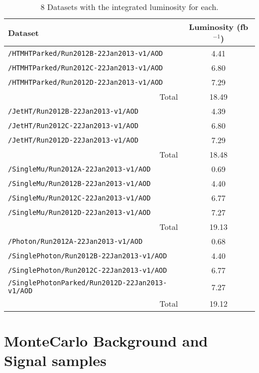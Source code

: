 \begin{table}[ht]
\caption{8 \tev Datasets with the integrated luminosity for each.}
  \label{tab:datasets}
  \centering
  \scriptsize
  \begin{tabular}{ lc }
    \hline
    \hline
    Dataset & Luminosity (fb$^{-1}$) \\
    \hline
    \verb!/HTMHTParked/Run2012B-22Jan2013-v1/AOD! & 4.41 \\
    \verb!/HTMHTParked/Run2012C-22Jan2013-v1/AOD! & 6.80 \\
    \verb!/HTMHTParked/Run2012D-22Jan2013-v1/AOD! & 7.29 \\
    \multicolumn{1}{r}{Total} & 18.49 \\ [0.5ex]
    \verb!/JetHT/Run2012B-22Jan2013-v1/AOD! & 4.39 \\
    \verb!/JetHT/Run2012C-22Jan2013-v1/AOD! & 6.80 \\
    \verb!/JetHT/Run2012D-22Jan2013-v1/AOD! & 7.29 \\
    \multicolumn{1}{r}{Total} & 18.48 \\ [0.5ex]
    \verb!/SingleMu/Run2012A-22Jan2013-v1/AOD! & 0.69 \\
    \verb!/SingleMu/Run2012B-22Jan2013-v1/AOD! & 4.40 \\
    \verb!/SingleMu/Run2012C-22Jan2013-v1/AOD! & 6.77 \\
    \verb!/SingleMu/Run2012D-22Jan2013-v1/AOD! & 7.27 \\
    \multicolumn{1}{r}{Total} & 19.13 \\ [0.5ex] %
    \verb!/Photon/Run2012A-22Jan2013-v1/AOD! & 0.68 \\
    \verb!/SinglePhoton/Run2012B-22Jan2013-v1/AOD! & 4.40 \\
    \verb!/SinglePhoton/Run2012C-22Jan2013-v1/AOD! & 6.77 \\
    \verb!/SinglePhotonParked/Run2012D-22Jan2013-v1/AOD! & 7.27 \\
    \multicolumn{1}{r}{Total} & 19.12 \\ [0.5ex] %
    \hline
    \hline
  \end{tabular}
\end{table}

\section{MonteCarlo Background and Signal samples}


